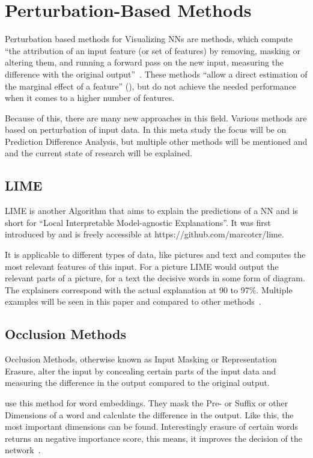 \section{Perturbation-Based Methods}
Perturbation based methods for Visualizing NNs are methods, which compute “the attribution of an input feature (or set of features) by removing, masking or altering them, and running a forward pass on the new input, measuring the difference with the original output”~\cite[2]{Acona.2018}.
These methods “allow a direct estimation of the marginal effect of a feature” (\cite[p.2]{Acona.2018}), but do not achieve the needed performance when it comes to a higher number of features.
\par
Because of this, there are many new approaches in this field.
Various methods are based on perturbation of input data. In this meta study the focus will be on Prediction Difference Analysis, but multiple other methods will be mentioned and and the current state of research will be explained.


\subsection{LIME}
LIME is another Algorithm that aims to explain the predictions of a NN and is short for “Local Interpretable Model-agnostic Explanations”. It was first introduced by  and is freely accessible at https://github.com/marcotcr/lime.
\par
It is applicable to different types of data, like pictures and text and computes the most relevant features of this input. For a picture LIME would output the relevant parts of a picture, for a text the decisive words in some form of diagram. The explainers correspond with the actual explanation at 90 to 97\%. Multiple examples will be seen in this paper and compared to other methods~\cite{Ribeiro.2016}.

\subsection{Occlusion Methods}
Occlusion Methods, otherwise known as Input Masking or Representation Erasure, alter the input by concealing certain parts of the input data and measuring the difference in the output compared to the original output. 
\par
{} use this method for word embeddings. They mask the Pre- or Suffix or other Dimensions of a word and calculate the difference in the output. Like this, the most important dimensions can be found. Interestingly erasure of certain words returns an negative importance score, this means, it improves the decision of the network~\cite{Li.2016}.

